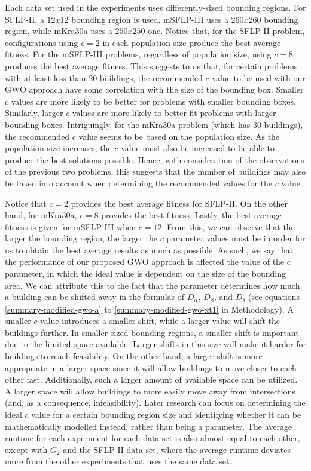 Each data set used in the experiments uses differently-sized bounding regions. For SFLP-II, a $12x12$ bounding region is used. mSFLP-III uses a $260x260$ bounding region, while mKra30a uses a $250x250$ one. Notice that, for the SFLP-II problem, configurations using $c = 2$ in each population size produce the best average fitness. For the mSFLP-III problems, regardless of population size, using $c = 8$ produces the best average fitness. This suggests to us that, for certain problems with at least less than 20 buildings, the recommended $c$ value to be used with our GWO approach have some correlation with the size of the bounding box. Smaller $c$ values are more likely to be better for problems with smaller bounding boxes. Similarly, larger $c$ values are more likely to better fit problems with larger bounding boxes. Intriguingly, for the mKra30a problem (which has 30 buildings), the recommended $c$ value seems to be based on the population size. As the population size increases, the $c$ value must also be increased to be able to produce the best solutions possible. Hence, with consideration of the observations of the previous two problems, this suggests that the number of buildings may also be taken into account when determining the recommended values for the $c$ value. %

Notice that $c = 2$ provides the best average fitness for SFLP-II. On the other hand, for mKra30a, $c = 8$ provides the best fitness. Lastly, the best average fitness is given for mSFLP-III when $c = 12$. From this, we can observe that the larger the bounding region, the larger the $c$ parameter values must be in order for us to obtain the best average results as much as possible. As such, we say that the performance of our proposed GWO approach is affected the value of the $c$ parameter, in which the ideal value is dependent on the size of the bounding area. We can attribute this to the fact that the parameter determines how much a building can be shifted away in the formulas of $D_{\alpha}$, $D_{\beta}$, and $D_{\delta}$ (see equations \ref{summary-modified-gwo-a} to \ref{summary-modified-gwo-xt1} in Methodology). A smaller $c$ value introduces a smaller shift, while a larger value will shift the buildings further. In smaller sized bounding regions, a smaller shift is important due to the limited space available. Larger shifts in this size will make it harder for buildings to reach feasibility. On the other hand, a larger shift is more appropriate in a larger space since it will allow buildings to move closer to each other fast. Additionally, such a larger amount of available space can be utilized. A larger space will allow buildings to more easily move away from intersections (and, as a consequence, infeasibility). Later research can focus on determining the ideal $c$ value for a certain bounding region size and identifying whether it can be mathematically modelled instead, rather than being a parameter. The average runtime for each experiment for each data set is also almost equal to each other, except with $G_{2}$ and the SFLP-II data set, where the average runtime deviates more from the other experiments that uses the same data set.


